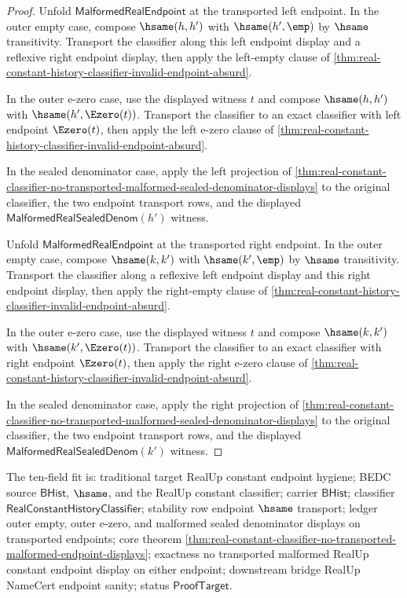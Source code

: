 \begin{proof}
Unfold $\mathsf{MalformedRealEndpoint}$ at the transported left endpoint.
In the outer empty case, compose $\hsame(h,h')$ with
$\hsame(h',\emp)$ by $\hsame$ transitivity. Transport the classifier along this
left endpoint display and a reflexive right endpoint display, then apply the
left-empty clause of
\autoref{thm:real-constant-history-classifier-invalid-endpoint-absurd}.

In the outer e-zero case, use the displayed witness $t$ and compose
$\hsame(h,h')$ with $\hsame(h',\Ezero(t))$. Transport the classifier to an
exact classifier with left endpoint $\Ezero(t)$, then apply the left e-zero
clause of
\autoref{thm:real-constant-history-classifier-invalid-endpoint-absurd}.

In the sealed denominator case, apply the left projection of
\autoref{thm:real-constant-classifier-no-transported-malformed-sealed-denominator-displays}
to the original classifier, the two endpoint transport rows, and the displayed
$\mathsf{MalformedRealSealedDenom}(h')$ witness.

Unfold $\mathsf{MalformedRealEndpoint}$ at the transported right endpoint.
In the outer empty case, compose $\hsame(k,k')$ with
$\hsame(k',\emp)$ by $\hsame$ transitivity. Transport the classifier along a
reflexive left endpoint display and this right endpoint display, then apply
the right-empty clause of
\autoref{thm:real-constant-history-classifier-invalid-endpoint-absurd}.

In the outer e-zero case, use the displayed witness $t$ and compose
$\hsame(k,k')$ with $\hsame(k',\Ezero(t))$. Transport the classifier to an
exact classifier with right endpoint $\Ezero(t)$, then apply the right e-zero
clause of
\autoref{thm:real-constant-history-classifier-invalid-endpoint-absurd}.

In the sealed denominator case, apply the right projection of
\autoref{thm:real-constant-classifier-no-transported-malformed-sealed-denominator-displays}
to the original classifier, the two endpoint transport rows, and the displayed
$\mathsf{MalformedRealSealedDenom}(k')$ witness.
\end{proof}

The ten-field fit is: traditional target RealUp constant endpoint hygiene;
BEDC source $\mathsf{BHist}$, $\hsame$, and the RealUp constant classifier;
carrier $\mathsf{BHist}$; classifier
$\mathsf{RealConstantHistoryClassifier}$; stability row endpoint $\hsame$
transport; ledger outer empty, outer e-zero, and malformed sealed denominator
displays on transported endpoints; core theorem
\autoref{thm:real-constant-classifier-no-transported-malformed-endpoint-displays};
exactness no transported malformed RealUp constant endpoint display on either
endpoint; downstream bridge RealUp NameCert endpoint sanity; status
$\mathsf{ProofTarget}$.

